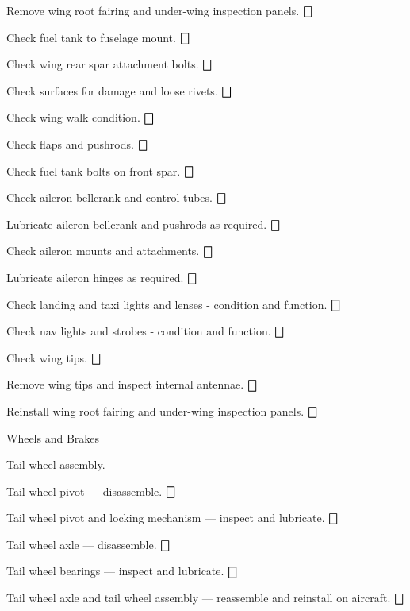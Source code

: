 \begin{enumerate*}
\begin{enumerate*}
		\item Remove wing root fairing and under-wing inspection panels.  \dotfill $\bigbox$
		\item Check fuel tank to fuselage mount. \dotfill $\bigbox$
		\item Check wing rear spar attachment bolts. \dotfill $\bigbox$
		\item Check surfaces for damage and loose rivets.  \dotfill $\bigbox$
		\item Check wing walk condition. \dotfill $\bigbox$
		\item Check flaps and pushrods. \dotfill $\bigbox$
		\item Check fuel tank bolts on front spar. \dotfill $\bigbox$
		\item Check aileron bellcrank and control tubes. \dotfill $\bigbox$
		\item Lubricate aileron bellcrank and pushrods as required. \dotfill $\bigbox$
		\item Check aileron mounts and attachments. \dotfill $\bigbox$
		\item Lubricate aileron hinges as required. \dotfill $\bigbox$
		\item Check landing and taxi lights and lenses - condition and function. \dotfill $\bigbox$
		\item Check nav lights and strobes - condition and function. \dotfill $\bigbox$
		\item Check wing tips. \dotfill $\bigbox$
		\item Remove wing tips and inspect internal antennae. \dotfill $\bigbox$
		\item Reinstall wing root fairing and under-wing inspection panels.  \dotfill $\bigbox$
	\end{enumerate*}
	\item{Wheels and Brakes} 
	\begin{enumerate*}
		\item Tail wheel assembly.  
		\begin{enumerate*}
		  \item Tail wheel pivot --- disassemble. \dotfill $\bigbox$
		  \item Tail wheel pivot and locking mechanism --- inspect and lubricate. \dotfill $\bigbox$
		  \item Tail wheel axle --- disassemble. \dotfill $\bigbox$
		  \item Tail wheel bearings --- inspect and lubricate. \dotfill $\bigbox$
		  \item Tail wheel axle and tail wheel assembly --- reassemble and reinstall on aircraft. \dotfill $\bigbox$

\end{enumerate*}
\end{enumerate*}
\end{enumerate*}

